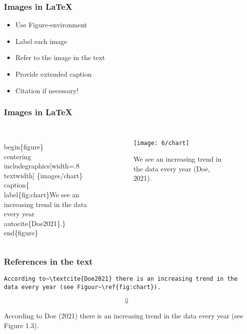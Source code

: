 \documentclass[aspectratio=169]{beamer}
\begin{document}
\begin{frame}
  \frametitle{Images in {\LaTeX}}

  \begin{itemize}
    \item Use Figure-environment
    \item Label each image
    \item Refer to the image in the text
    \item Provide extended caption
    \item Citation if necessary!
  \end{itemize}

\end{frame}

\begin{frame}
  \frametitle{Images in {\LaTeX}}

  \begin{columns}[c]

\begin{semiverbatim}
\small
\alert<1>{\\begin\{figure\}}
  \alert<2>{\\centering}
  \alert<3>{\\includegraphics[width=.8\\textwidth]
    \{images/chart\}}
 \alert<4>{\\caption\{\alert<5>{\\label\{fig:chart\}}We see an increasing trend in
     the data every year \alert<6>{\\autocite\{Doe2021\}}.\}}
\alert<1>{\\end\{figure\}}
\end{semiverbatim}

    \begin{figure}
      \centering
      \texttt{[image: 6/chart]}
      \caption{\label{fig:chart} We see an increasing trend in the data every year (Doe, 2021).}
    \end{figure}

  \end{columns}

\end{frame}

\begin{frame}[fragile]
  \frametitle{References in the text}

  \begin{verbatim}
According to~\textcite{Doe2021} there is an increasing trend in the data every year (see Figuur~\ref{fig:chart}).
\end{verbatim}

  \[\Downarrow\]

  \bigskip

  According to Doe (2021) there is an increasing trend in 
  the data every year (see Figure 1.3).

\end{frame}
\end{document}
